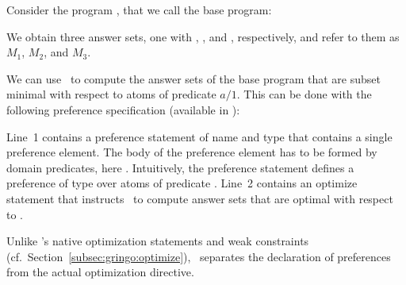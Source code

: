 \begin{example}
Consider the program
, 
that we call the base program:
%

%
We obtain three answer sets, one with , , and , respectively,
and refer to them as $M_1$, $M_2$, and $M_3$.

We can use \asprin\ to compute the answer sets of the base program that are subset minimal with respect to atoms of predicate $a/1$. 
This can be done with the following preference specification 
(available in ): 
%

%
Line~1 contains a preference statement of name  and type  that contains a single preference element.
The body of the preference element has to be formed by domain predicates, here .
Intuitively, the preference statement  defines a preference of type  over atoms of predicate . 
Line~2 contains an optimize statement that instructs \asprin\ to compute answer sets that are optimal with respect to . 

\begin{note}
Unlike \gringo's native optimization statements and weak constraints (cf.\ Section~\ref{subsec:gringo:optimize}),
\asprin\ separates the declaration of preferences from the actual optimization directive.
\eexample
\end{note}


\end{example}
